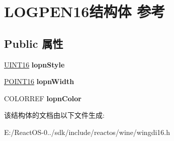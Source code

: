 \hypertarget{struct_l_o_g_p_e_n16}{}\section{L\+O\+G\+P\+E\+N16结构体 参考}
\label{struct_l_o_g_p_e_n16}
\subsection*{Public 属性}
\begin{DoxyCompactItemize}
\item 
\mbox{\label{struct_l_o_g_p_e_n16_ae5fbcf7defb3a81bb6438295e91bea22}} 
\hyperlink{_processor_bind_8h_a09f1a1fb2293e33483cc8d44aefb1eb1}{U\+I\+N\+T16} {\bfseries lopn\+Style}
\item 
\mbox{\label{struct_l_o_g_p_e_n16_acc8afb26ee509c40eaffcb659345af23}} 
\hyperlink{struct_p_o_i_n_t16}{P\+O\+I\+N\+T16} {\bfseries lopn\+Width}
\item 
\mbox{\label{struct_l_o_g_p_e_n16_adac5a9cccda475389ea40d72908bca33}} 
C\+O\+L\+O\+R\+R\+EF {\bfseries lopn\+Color}
\end{DoxyCompactItemize}


该结构体的文档由以下文件生成\+:\begin{DoxyCompactItemize}
\item 
E\+:/\+React\+O\+S-\/0../sdk/include/reactos/wine/wingdi16.\+h\end{DoxyCompactItemize}
